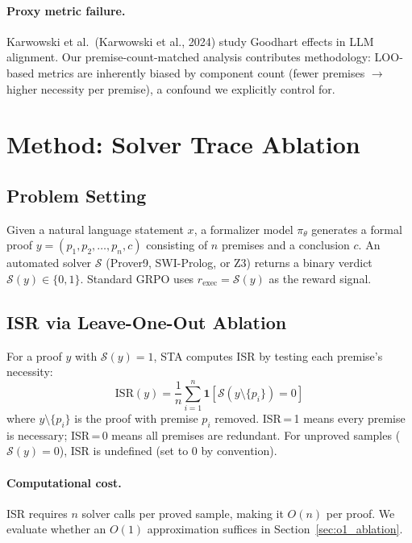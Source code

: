 \documentclass[11pt,a4paper]{article}
\begin{document}
\paragraph{Proxy metric failure.}
Karwowski et al.\ (Karwowski et al., 2024) study Goodhart effects in LLM alignment.
Our premise-count-matched analysis contributes methodology: LOO-based metrics are inherently biased by component count (fewer premises $\rightarrow$ higher necessity per premise), a confound we explicitly control for.

\section{Method: Solver Trace Ablation}
\label{sec:method}

\subsection{Problem Setting}

Given a natural language statement $x$, a formalizer model $\pi_\theta$ generates a formal proof $y = (p_1, p_2, \ldots, p_n, c)$ consisting of $n$ premises and a conclusion $c$.
An automated solver $\mathcal{S}$ (Prover9, SWI-Prolog, or Z3) returns a binary verdict $\mathcal{S}(y) \in \{0, 1\}$.
Standard GRPO uses $r_{\text{exec}} = \mathcal{S}(y)$ as the reward signal.

\subsection{ISR via Leave-One-Out Ablation}

For a proof $y$ with $\mathcal{S}(y) = 1$, STA computes ISR by testing each premise's necessity:
\begin{equation}
\text{ISR}(y) = \frac{1}{n} \sum_{i=1}^{n} \mathbf{1}\left[\mathcal{S}(y \setminus \{p_i\}) = 0\right]
\label{eq:isr}
\end{equation}
where $y \setminus \{p_i\}$ is the proof with premise $p_i$ removed.
ISR\,=\,1 means every premise is necessary; ISR\,=\,0 means all premises are redundant.
For unproved samples ($\mathcal{S}(y) = 0$), ISR is undefined (set to 0 by convention).

\paragraph{Computational cost.}
ISR requires $n$ solver calls per proved sample, making it $O(n)$ per proof.
We evaluate whether an $O(1)$ approximation suffices in Section~\ref{sec:o1_ablation}.
\end{document}
